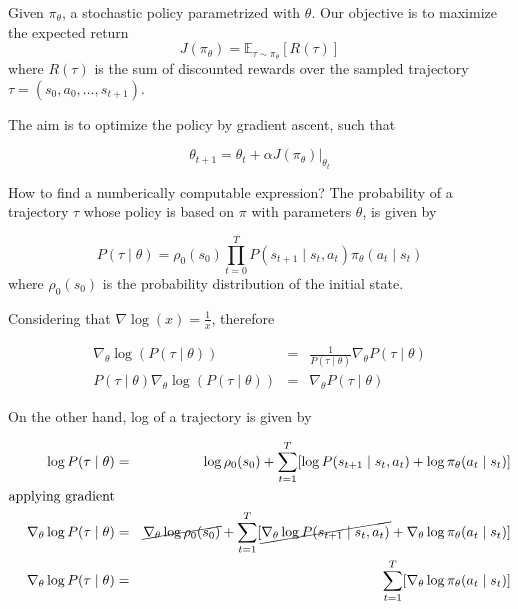 \documentclass[12pt, english]{article}
\begin{document}
Given $\pi_\theta$, a stochastic policy parametrized with $\theta$. Our objective is to maximize the expected return
\begin{equation}
  \label{eqn_expected_return}
  J(\pi_\theta) = \mathbb{E}_{\tau \sim \pi_\theta} [R(\tau)]
\end{equation}
%
where $R(\tau)$ is the sum of discounted rewards over the sampled trajectory $\tau = (s_0, a_0, \dots, s_{t+1})$.

The aim is to optimize the policy by gradient ascent, such that

\begin{equation}
  \theta_{t+1} = \theta_t + \alpha J(\pi_\theta)\Bigr|_{\theta_t}
\end{equation}

How to find a numberically computable expression? The probability of a trajectory $\tau$ whose policy is based on $\pi$ with parameters $\theta$, is given by

\begin{equation}
  \label{eqn_trajectory_probability}
  P(\tau \mid \theta) = \rho_0 (s_0) \prod_{t=0}^T P(s_{t+1} \mid s_t, a_t) \pi_\theta (a_t \mid s_t)
\end{equation}
%
where $\rho_0 (s_0)$ is the probability distribution of the initial state.

Considering that $\nabla \log (x) = \frac{1}{x}$, therefore

\begin{eqnarray*}
  \nabla_\theta \log (P(\tau \mid \theta)) &=& \frac{1}{P(\tau \mid \theta)} \nabla_\theta P(\tau \mid \theta) \\ \nonumber
  P(\tau \mid \theta) \nabla_\theta \log (P(\tau \mid \theta)) &=& \nabla_\theta P(\tau \mid \theta)
\end{eqnarray*}

On the other hand, log of a trajectory is given by

\begin{eqnarray}
  \log P(\tau \mid \theta) &=& \log \rho_0 (s_0) + \sum_{t=1}^T [\log P(s_{t+1} \mid s_t, a_t) + \log \pi_\theta (a_t \mid s_t)] \\
  \text{applying gradient} \nonumber \\
  \nabla_\theta \log P(\tau \mid \theta) &=& \cancel{\nabla_\theta \log \rho_0 (s_0)} + \sum_{t=1}^T[ \cancel{\nabla_\theta \log P(s_{t+1} \mid s_t, a_t)} + \nabla_\theta \log \pi_\theta (a_t \mid s_t)] \nonumber \\
  \nabla_\theta \log P(\tau \mid \theta) &=& \sum_{t=1}^T[\nabla_\theta \log \pi_\theta (a_t \mid s_t)] \label{eqn_grad_log_trajectory}
\end{eqnarray}
\end{document}
